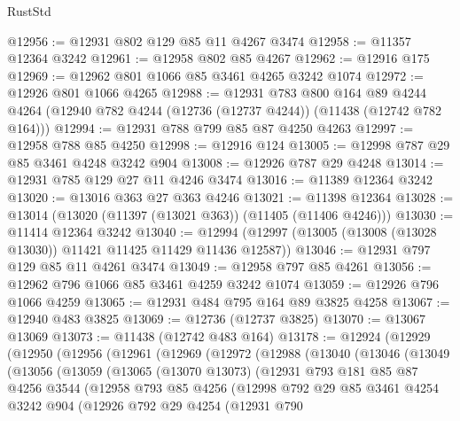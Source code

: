 \begin{lexlean}{RustStd}
\begin{coremodule}
@12956 := @12931 @802 @129 @85 @11 @4267 @3474
@12958 := @11357 @12364 @3242
@12961 := @12958 @802 @85 @4267
@12962 := @12916 @175
@12969 := @12962 @801 @1066 @85 @3461 @4265 @3242 @1074
@12972 := @12926 @801 @1066 @4265
@12988 := @12931
    @783
    @800
    @164
    @89
    @4244
    @4264
    (@12940 @782 @4244 (@12736 (@12737 @4244)) (@11438 (@12742 @782 @164)))
@12994 := @12931 @788 @799 @85 @87 @4250 @4263
@12997 := @12958 @788 @85 @4250
@12998 := @12916 @124
@13005 := @12998 @787 @29 @85 @3461 @4248 @3242 @904
@13008 := @12926 @787 @29 @4248
@13014 := @12931 @785 @129 @27 @11 @4246 @3474
@13016 := @11389 @12364 @3242
@13020 := @13016 @363 @27 @363 @4246
@13021 := @11398 @12364
@13028 := @13014 (@13020 (@11397 (@13021 @363)) (@11405 (@11406 @4246)))
@13030 := @11414 @12364 @3242
@13040 := @12994 (@12997 (@13005 (@13008 (@13028 @13030)) @11421 @11425 @11429 @11436 @12587))
@13046 := @12931 @797 @129 @85 @11 @4261 @3474
@13049 := @12958 @797 @85 @4261
@13056 := @12962 @796 @1066 @85 @3461 @4259 @3242 @1074
@13059 := @12926 @796 @1066 @4259
@13065 := @12931 @484 @795 @164 @89 @3825 @4258
@13067 := @12940 @483 @3825
@13069 := @12736 (@12737 @3825)
@13070 := @13067 @13069
@13073 := @11438 (@12742 @483 @164)
@13178 := @12924
    (@12929
      (@12950
        (@12956
          (@12961
            (@12969
              (@12972
                (@12988
                  (@13040
                    (@13046
                      (@13049
                        (@13056
                          (@13059
                            (@13065
                              (@13070 @13073)
                              (@12931
                                @793
                                @181
                                @85
                                @87
                                @4256
                                @3544
                                (@12958
                                  @793
                                  @85
                                  @4256
                                  (@12998
                                    @792
                                    @29
                                    @85
                                    @3461
                                    @4254
                                    @3242
                                    @904
                                    (@12926
                                      @792
                                      @29
                                      @4254
                                      (@12931
                                        @790

\end{coremodule}
\end{lexlean}
